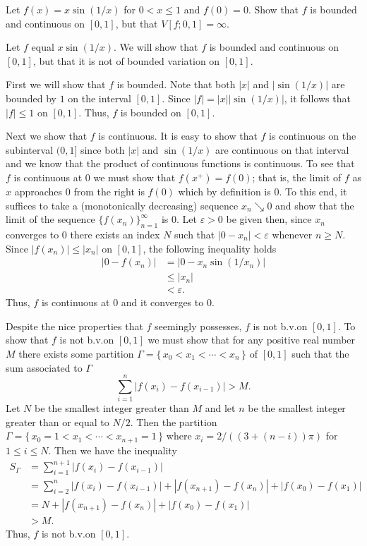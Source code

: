 \begin{problem}
  Let $f(x)=x\sin(1/x)$ for $0<x\leq 1$ and $f(0)=0$. Show that $f$ is
  bounded and continuous on $[0,1]$, but that $V[f;0,1]=\infty$.
\end{problem}
\begin{solution}
  Let $f$ equal $x\sin(1/x)$. We will show that $f$ is bounded and
  continuous on $[0,1]$, but that it is not of bounded variation on
  $[0,1]$.

  First we will show that $f$ is bounded. Note that both $|x|$ and
  $|\sin(1/x)|$ are bounded by $1$ on the interval $[0,1]$. Since
  $|f|=|x||\sin(1/x)|$, it follows that $|f|\leq 1$ on $[0,1]$. Thus, $f$
  is bounded on $[0,1]$.

  Next we show that $f$ is continuous. It is easy to show that $f$ is
  continuous on the subinterval $(0,1]$ since both $|x|$ and $\sin(1/x)$
  are continuous on that interval and we know that the product of
  continuous functions is continuous. To see that $f$ is continuous at $0$
  we must show that $f(x^+)=f(0)$; that is, the limit of $f$ as $x$
  approaches $0$ from the right is $f(0)$ which by definition is $0$. To
  this end, it suffices to take a (monotonically decreasing) sequence
  $x_n\searrow 0$ and show that the limit of the sequence
  ${\{f(x_n)\}}_{n=1}^\infty$ is $0$. Let $\varepsilon>0$ be given then,
  since $x_n$ converges to $0$ there exists an index $N$ such that
  $|0-x_n|<\varepsilon$ whenever $n\geq N$. Since $|f(x_n)|\leq |x_n|$ on
  $[0,1]$, the following inequality holds
  \begin{align*}
    |0-f(x_n)|
    &=\left|0-x_n\sin(1/x_n)\right|\\
    &\leq |x_n|\\
    &<\varepsilon.
  \end{align*}
  Thus, $f$ is continuous at $0$ and it converges to $0$.

  Despite the nice properties that $f$ seemingly possesses, $f$ is not
  b.v.\@ on $[0,1]$. To show that $f$ is not b.v.\@ on $[0,1]$ we must show
  that for any positive real number $M$ there exists some partition
  $\Gamma=\{\,x_0<x_1<\cdots<x_n\,\}$ of $[0,1]$ such that the sum
  associated to $\Gamma$
  \[
    \sum_{i=1}^n|f(x_i)-f(x_{i-1})|>M.
  \]
  Let $N$ be the smallest integer greater than $M$ and let $n$ be the
  smallest integer greater than or equal to $N/2$. Then the partition
  $\Gamma=\{\,x_0=1<x_1<\cdots<x_{n+1}=1\,\}$ where
  $x_i=2/((3+(n-i))\pi)$ for $1\leq i\leq N$. Then we have
  the inequality
  \begin{align*}
    S_\Gamma
    &=\sum_{i=1}^{n+1}|f(x_i)-f(x_{i-1})|\\
    &=\sum_{i=2}^n
      |f(x_i)-f(x_{i-1})|+|f(x_{n+1})-f(x_n)|+|f(x_0)-f(x_1)|\\
    &=N+|f(x_{n+1})-f(x_n)|+|f(x_0)-f(x_1)|\\
    &>M.
  \end{align*}
  Thus, $f$ is not b.v.\@ on $[0,1]$.
\end{solution}

